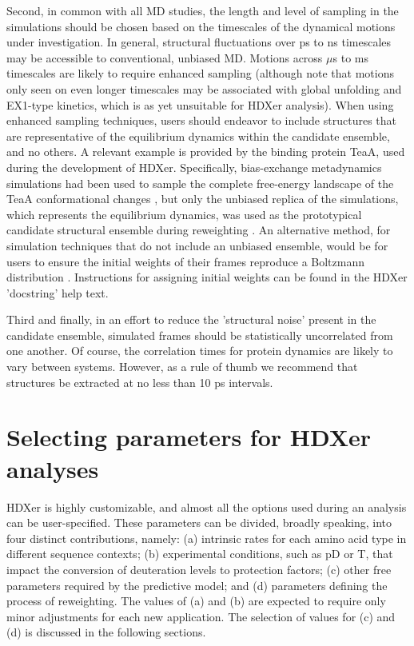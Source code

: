 \documentclass[9pt,tutorial]{livecoms}
\begin{document}
Second, in common with all MD studies, the length and level of sampling in the simulations should be chosen based on the timescales of the dynamical motions under investigation. 
In general, structural fluctuations over ps to ns timescales may be accessible to conventional, unbiased MD. 
Motions across $\mu$s to ms timescales are likely to require enhanced sampling \cite{Allison2020} (although note that motions only seen on even longer timescales may be associated with global unfolding and EX1-type kinetics, which is as yet unsuitable for HDXer analysis). 
When using enhanced sampling techniques, users should endeavor to include structures that are representative of the equilibrium dynamics within the candidate ensemble, and no others. 
A relevant example is provided by the binding protein TeaA, used during the development of HDXer.
Specifically, bias-exchange metadynamics simulations had been used to sample the complete free-energy landscape of the TeaA conformational changes \cite{Marinelli2011}, but only the unbiased replica of the simulations, which represents the equilibrium dynamics, was used as the prototypical candidate structural ensemble during reweighting \cite{Bradshaw2020}.
An alternative method, for simulation techniques that do not include an unbiased ensemble, would be for users to ensure the initial weights of their frames reproduce a Boltzmann distribution \cite{Torrie1977, Marinelli2021}.
Instructions for assigning initial weights can be found in the HDXer 'docstring' help text.

Third and finally, in an effort to reduce the 'structural noise' present in the candidate ensemble, simulated frames should be statistically uncorrelated from one another.
Of course, the correlation times for protein dynamics are likely to vary between systems.
However, as a rule of thumb we recommend that structures be extracted at no less than 10 ps intervals.

\section{Selecting parameters for HDXer analyses}
HDXer is highly customizable, and almost all the options used during an analysis can be user-specified. 
These parameters can be divided, broadly speaking, into four distinct contributions, namely: (a) intrinsic rates for each amino acid type in different sequence contexts; (b) experimental conditions, such as pD or T, that impact the conversion of deuteration levels to protection factors; (c) other free parameters required by the predictive model; and (d) parameters defining the process of reweighting. 
The values of (a) and (b) are expected to require only minor adjustments for each new application.
The selection of values for (c) and (d) is discussed in the following sections.
\end{document}
